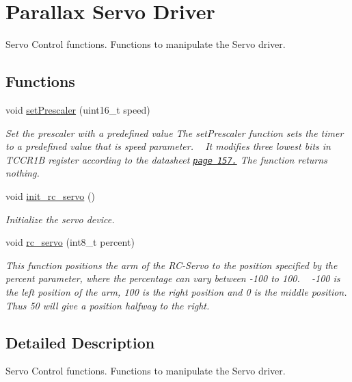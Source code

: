 \hypertarget{group__servo__module}{}\section{Parallax Servo Driver}
\label{group__servo__module}


Servo Control functions. Functions to manipulate the Servo driver.  


\subsection*{Functions}
\begin{DoxyCompactItemize}
\item 
void \hyperlink{group__servo__module_ga859a2e40622c3b91e13f435fb914af1b}{set\+Prescaler} (uint16\+\_\+t speed)
\begin{DoxyCompactList}\small\item\em Set the prescaler with a predefined value The set\+Prescaler function sets the timer to a predefined value that is {\itshape speed} parameter. ~\newline
It modifies three lowest bits in T\+C\+C\+R1\+B register according to the datasheet \href{../docs/p157.pdf}{\tt page 157.} The function returns nothing. \end{DoxyCompactList}\item 
void \hyperlink{group__servo__module_gad5afd3abc18b3673732542edceb5e6c1}{init\+\_\+rc\+\_\+servo} ()
\begin{DoxyCompactList}\small\item\em Initialize the servo device. \end{DoxyCompactList}\item 
void \hyperlink{group__servo__module_ga9965d379cdb28b35126dcb75adf400c3}{rc\+\_\+servo} (int8\+\_\+t percent)
\begin{DoxyCompactList}\small\item\em This function positions the arm of the R\+C-\/\+Servo to the position specified by the percent parameter, where the percentage can vary between -\/100 to 100. ~\newline
-\/100 is the left position of the arm, 100 is the right position and 0 is the middle position. Thus 50 will give a position halfway to the right. \end{DoxyCompactList}\end{DoxyCompactItemize}


\subsection{Detailed Description}
Servo Control functions. Functions to manipulate the Servo driver. 



